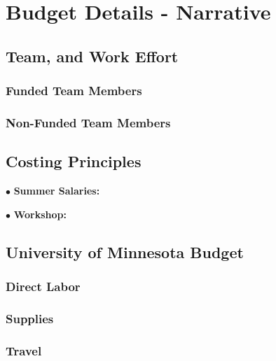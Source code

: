 
\section{Budget Details - Narrative}
\label{sec:budget}


\subsection{Team, and Work Effort}
\label{sec:budget_principles}


\subsubsection{Funded Team Members}


\subsubsection{Non-Funded Team Members}


\subsection{Costing Principles}
\label{sec:cost_principles}


$\bullet$ \hspace{0.2in} {\bf Summer Salaries:} 


$\bullet$ \hspace{0.2in} {\bf Workshop:} 


        \subsection{University of Minnesota Budget}


            \subsubsection{Direct Labor} 


            \subsubsection{Supplies} 

  
            \subsubsection{Travel} 


